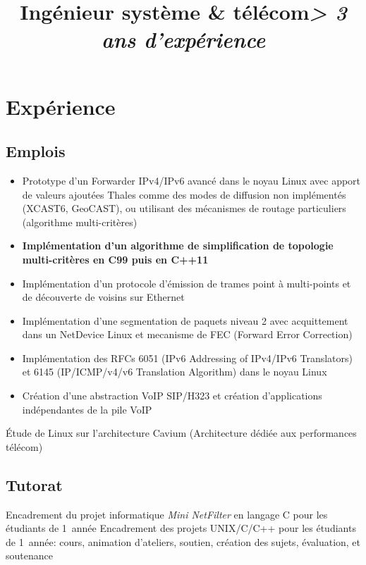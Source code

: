 \documentclass[11pt, a4paper]{moderncv}
\title{\textbf{Ingénieur système \& télécom}\newline \Large{\textit{> 3 ans d'expérience}}}
\begin{document}
\maketitle

\section{Expérience}
\subsection{Emplois}
{
  \begin{itemize}
    \renewcommand{\labelitemi}{$\bullet$  }
    \item Prototype d'un Forwarder IPv4/IPv6 avancé dans le noyau Linux avec apport de valeurs ajoutées
	Thales comme des modes de diffusion non implémentés (XCAST6, GeoCAST), ou utilisant des mécanismes
	de routage particuliers (algorithme multi-critères)
    \item \textbf{Implémentation d'un algorithme de simplification de topologie multi-critères en C99 puis en C++11}
    \item Implémentation d'un protocole d'émission de trames point \`a multi-points et de découverte
	de voisins sur Ethernet
    \item Implémentation d'une segmentation de paquets niveau 2 avec acquittement dans un NetDevice
	Linux et mecanisme de FEC (Forward Error Correction)
    \item Implémentation des RFCs 6051 (IPv6 Addressing of IPv4/IPv6 Translators) et 6145 (IP/ICMP/v4/v6
	Translation Algorithm) dans le noyau Linux
    \item Création d'une abstraction VoIP SIP/H323 et création d'applications indépendantes de la
	pile VoIP
  \end{itemize}
}
{
  Étude de Linux sur l'architecture Cavium (Architecture dédiée aux performances télécom)
}

\subsection{Tutorat}
	      {Encadrement du projet informatique \textit{Mini NetFilter} en langage C pour les étudiants
		de 1\iere\ année}
	      {Encadrement des projets UNIX/C/C++ pour les étudiants de 1\iere\ année: cours,
		animation d'ateliers, soutien, création des sujets, évaluation, et soutenance}
\end{document}

